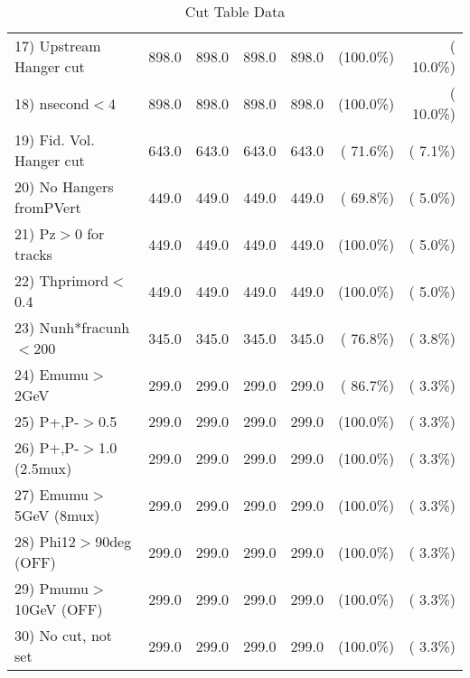 \begin{table}[h!]
\begin{tabular}{||l||r|r|r|r|r|r||}
 17) Upstream Hanger cut  &        898.0 &        898.0 &        898.0 &        898.0 & (100.0\%) & ( 10.0\%) \\
 18) nsecond$<$4          &        898.0 &        898.0 &        898.0 &        898.0 & (100.0\%) & ( 10.0\%) \\
 19) Fid. Vol. Hanger cut &        643.0 &        643.0 &        643.0 &        643.0 & ( 71.6\%) & (  7.1\%) \\
 20) No Hangers fromPVert &        449.0 &        449.0 &        449.0 &        449.0 & ( 69.8\%) & (  5.0\%) \\
 21) Pz$>$0 for tracks    &        449.0 &        449.0 &        449.0 &        449.0 & (100.0\%) & (  5.0\%) \\
 22) Thprimord$<$0.4      &        449.0 &        449.0 &        449.0 &        449.0 & (100.0\%) & (  5.0\%) \\
 23) Nunh*fracunh$<$200   &        345.0 &        345.0 &        345.0 &        345.0 & ( 76.8\%) & (  3.8\%) \\
 24) Emumu$>$2GeV         &        299.0 &        299.0 &        299.0 &        299.0 & ( 86.7\%) & (  3.3\%) \\
 25) P+,P-$>$0.5          &        299.0 &        299.0 &        299.0 &        299.0 & (100.0\%) & (  3.3\%) \\
 26) P+,P-$>$1.0 (2.5mux) &        299.0 &        299.0 &        299.0 &        299.0 & (100.0\%) & (  3.3\%) \\
 27) Emumu$>$5GeV  (8mux) &        299.0 &        299.0 &        299.0 &        299.0 & (100.0\%) & (  3.3\%) \\
 28) Phi12$>$90deg  (OFF) &        299.0 &        299.0 &        299.0 &        299.0 & (100.0\%) & (  3.3\%) \\
 29) Pmumu$>$10GeV  (OFF) &        299.0 &        299.0 &        299.0 &        299.0 & (100.0\%) & (  3.3\%) \\
 30) No cut, not set      &        299.0 &        299.0 &        299.0 &        299.0 & (100.0\%) & (  3.3\%) \\
 \hline
 \hline
 \end{tabular}
 \caption{Cut Table  Data     }
 \label{tab-cutcohjpsi-mumu_data}
 \end{table}
